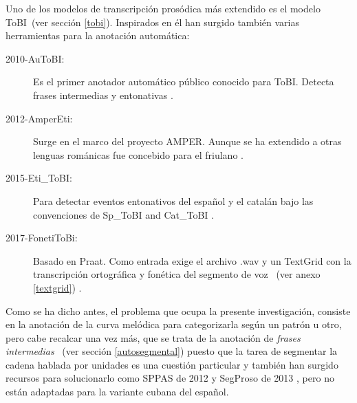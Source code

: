 Uno de los modelos de transcripci\'on pros\'odica m\'as extendido es el modelo ToBI~(ver secci\'on \ref{tobi}). Inspirados en \'el han surgido tambi\'en varias herramientas para la anotaci\'on autom\'atica:

\begin{description}
\item[2010-AuToBI:]  Es el primer anotador autom\'atico p\'ublico conocido para ToBI. Detecta frases intermedias y entonativas \cite{rosenberg2010autobi}. 
\item[2012-AmperEti:] Surge en el marco del proyecto AMPER. Aunque se ha extendido a otras lenguas rom\'anicas fue concebido para el friulano \cite{roseanoetiquetaje}.
\item[2015-Eti\_ToBI:] Para detectar eventos entonativos del espa\~nol y el catal\'an bajo las convenciones de Sp\_ToBI and Cat\_ToBI \cite{elvira2016tool}.
\item[2017-FonetiToBi:] Basado en Praat. Como entrada exige el archivo .wav y un TextGrid con la transcripci\'on ortogr\'afica y fon\'etica del segmento de voz ~(ver anexo \ref{textgrid}) \cite{lahoz2019subsidia}.
\end{description}


Como se ha dicho antes, el problema que ocupa la presente investigaci\'on, consiste en la anotaci\'on de la curva mel\'odica para categorizarla seg\'un un patr\'on u otro, pero cabe recalcar una vez m\'as, que se trata de la anotaci\'on de \emph{frases intermedias} ~(ver secci\'on \ref{autosegmental}) puesto que la tarea de segmentar la cadena hablada por unidades es una cuesti\'on particular y tambi\'en han surgido recursos para solucionarlo como SPPAS de 2012 \cite{bigi2012sppas} y  SegProso de 2013 \cite{garridosegproso}, pero no est\'an adaptadas para la variante cubana del espa\~nol.
